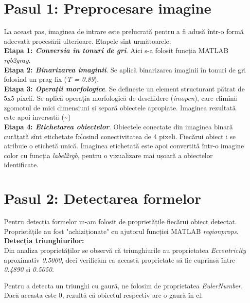 \documentclass[12pt]{article}
\begin{document}
\section{Pasul 1: Preprocesare imagine}


La aceast pas, imaginea de intrare este prelucrată pentru a fi adusă 
într-o formă adecvată procesării ulterioare. Etapele sînt următoarele: \\

\textbf{Etapa 1: \emph{Conversia în tonuri de gri}}. Aici s-a folosit funcția
MATLAB \emph{rgb2gray}. \\

\textbf{Etapa 2: \emph{Binarizarea imaginii}}. Se aplică binarizarea imaginii în 
tonuri de gri folosind un prag fix (\emph{T = 0.89}). \\

\textbf{Etapa 3: \emph{Operații morfologice}}. Se definește un element structurant 
pătrat de 5x5 pixeli. Se aplică operația morfologică de deschidere (\emph{imopen}), care
elimină zgomotul de mici dimensiuni și separă obiectele apropiate. Imaginea
rezultată este apoi inversată (\~{}) \\

\textbf{Etapa 4: \emph{Etichetarea obiectelor}}. Obiectele conectate din imaginea
binară curățată sînt etichetate folosind conectivitatea de 4 pixeli. Fiecărui 
obiect i se atribuie o etichetă unică. Imaginea etichetată este apoi convertită 
într-o imagine color cu funcția \emph{label2rgb}, pentru o vizualizare mai ușoară a 
obiectelor identificate. \\

\section{Pasul 2: Detectarea formelor}

Pentru detecția formelor m-am folosit de proprietățile fiecărui obiect detectat.
Proprietățile au fost "achiziționate" cu ajutorul funcției MATLAB \emph{regionprops}. \\

\textbf{Detecția triunghiurilor:} \\
\indent Din analiza proprietăților se observă că triunghiurile au proprietatea \emph{Eccentricity}
aproximativ \emph{0.5000}, deci verificăm ca această proprietate să fie cuprinsă între 
\emph{0.4890} și \emph{0.5050}. 

Pentru a detecta un triunghi cu gaură, ne folosim de
proprietatea \emph{EulerNumber}. Dacă aceasta este 0, rezultă că obiectul respectiv are
o gaură în el.
\end{document}
